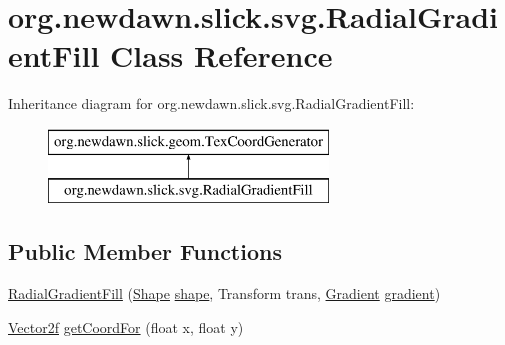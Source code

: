 \hypertarget{classorg_1_1newdawn_1_1slick_1_1svg_1_1_radial_gradient_fill}{}\section{org.\+newdawn.\+slick.\+svg.\+Radial\+Gradient\+Fill Class Reference}
\label{classorg_1_1newdawn_1_1slick_1_1svg_1_1_radial_gradient_fill}
Inheritance diagram for org.\+newdawn.\+slick.\+svg.\+Radial\+Gradient\+Fill\+:\begin{figure}[H]
\begin{center}
\leavevmode
\includegraphics[height=2.000000cm]{classorg_1_1newdawn_1_1slick_1_1svg_1_1_radial_gradient_fill}
\end{center}
\end{figure}
\subsection*{Public Member Functions}
\begin{DoxyCompactItemize}
\item 
\mbox{\hyperlink{classorg_1_1newdawn_1_1slick_1_1svg_1_1_radial_gradient_fill_a6868e613687dd66b50637f2f5a2bc8ee}{Radial\+Gradient\+Fill}} (\mbox{\hyperlink{classorg_1_1newdawn_1_1slick_1_1geom_1_1_shape}{Shape}} \mbox{\hyperlink{classorg_1_1newdawn_1_1slick_1_1svg_1_1_radial_gradient_fill_aad26e36b37c63657649bf34da1dcc075}{shape}}, Transform trans, \mbox{\hyperlink{classorg_1_1newdawn_1_1slick_1_1svg_1_1_gradient}{Gradient}} \mbox{\hyperlink{classorg_1_1newdawn_1_1slick_1_1svg_1_1_radial_gradient_fill_acabcc0fa37af23d8451201c035fc4cfd}{gradient}})
\item 
\mbox{\hyperlink{classorg_1_1newdawn_1_1slick_1_1geom_1_1_vector2f}{Vector2f}} \mbox{\hyperlink{classorg_1_1newdawn_1_1slick_1_1svg_1_1_radial_gradient_fill_a5709cfc21a18fd1489d0d0a5efdf46bf}{get\+Coord\+For}} (float x, float y)
\end{DoxyCompactItemize}
